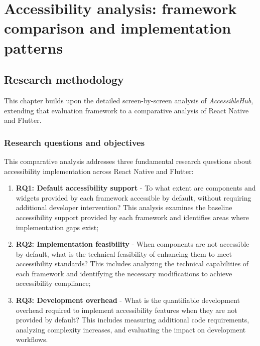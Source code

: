 \chapter{Accessibility analysis: framework comparison and implementation patterns} 
\label{chap:accessibility-implementation}

\section{Research methodology}
\label{subsec:analysis-research}

This chapter builds upon the detailed screen-by-screen analysis of \textit{AccessibleHub}, extending that evaluation framework to a comparative analysis of React Native and Flutter. 

\subsection{Research questions and objectives}

This comparative analysis addresses three fundamental research questions about accessibility implementation across React Native and Flutter:

\begin{enumerate}
    \item \textbf{RQ1: Default accessibility support} - To what extent are components and widgets provided by each framework accessible by default, without requiring additional developer intervention? This analysis examines the baseline accessibility support provided by each framework and identifies areas where implementation gaps exist;
    
    \item \textbf{RQ2: Implementation feasibility} - When components are not accessible by default, what is the technical feasibility of enhancing them to meet accessibility standards? This includes analyzing the technical capabilities of each framework and identifying the necessary modifications to achieve accessibility compliance;
    
    \item \textbf{RQ3: Development overhead} - What is the quantifiable development overhead required to implement accessibility features when they are not provided by default? This includes measuring additional code requirements, analyzing complexity increases, and evaluating the impact on development workflows.
\end{enumerate}

